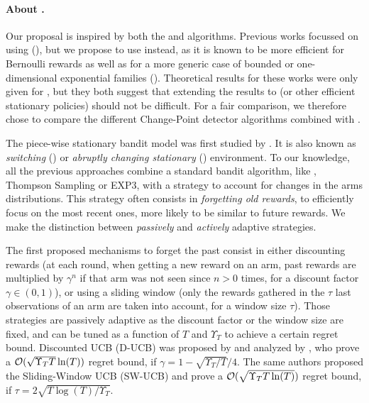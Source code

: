 \paragraph{About \klUCB.}
%
Our proposal \GLRklUCB{} is inspired by both the \MUCB{} and \CUSUMUCB{} algorithms.
Previous works focussed on using \UCB{} (\cite{LiuLeeShroff17,CaoZhenKvetonXie18}),
but we propose to use \klUCB{} instead, as it is known to be more efficient for Bernoulli rewards as well as for a more generic case of bounded or one-dimensional exponential families (\cite{KLUCBJournal}).
Theoretical results for these works were only given for \UCB, but they both suggest that extending the results to \klUCB{} (or other efficient stationary policies) should not be difficult.
For a fair comparison, we therefore chose to compare the different Change-Point detector algorithms combined with \klUCB.


The piece-wise stationary bandit model was first studied by \cite{Kocsis06,YuMannor09,Garivier11UCBDiscount}. It is also known as \emph{switching} (\cite{MellorShapiro13}) or \emph{abruptly changing stationary} (\cite{WeiSrivastava18}) environment. %
To our knowledge, all the previous approaches combine a standard bandit algorithm, like \UCB{}, Thompson Sampling or EXP3, with a strategy to account for changes in the arms distributions. This strategy often consists in \emph{forgetting old rewards}, to efficiently focus on the most recent ones, more likely to be similar to future rewards. We make the distinction between \emph{passively} and \emph{actively} adaptive strategies.


The first proposed mechanisms to forget the past consist in either discounting rewards (at each round, when getting a new reward on an arm, past rewards are multiplied by $\gamma^n$ if that arm was not seen since $n>0$ times, for a discount factor $\gamma\in(0,1)$), or using a sliding window (only the rewards gathered in the $\tau$ last observations of an arm are taken into account, for a window size $\tau$).
Those strategies are passively adaptive as the discount factor or the window size are fixed, and can be tuned as a function of $T$ and $\Upsilon_T$ to achieve a certain regret bound.
Discounted UCB (D-UCB) was proposed by \cite{Kocsis06} and analyzed by \cite{Garivier11UCBDiscount}, who prove a $\mathcal{O}(\sqrt{\Upsilon_T T }\ln(T))$ regret bound, if $\gamma = 1 - \sqrt{\Upsilon_T/T}/4$.
The same authors proposed the Sliding-Window UCB (SW-UCB) and prove a $\mathcal{O}(\sqrt{\Upsilon_T T \ln(T)})$ regret bound, if $\tau = 2 \sqrt{T\log(T)/\Upsilon_T}$.

